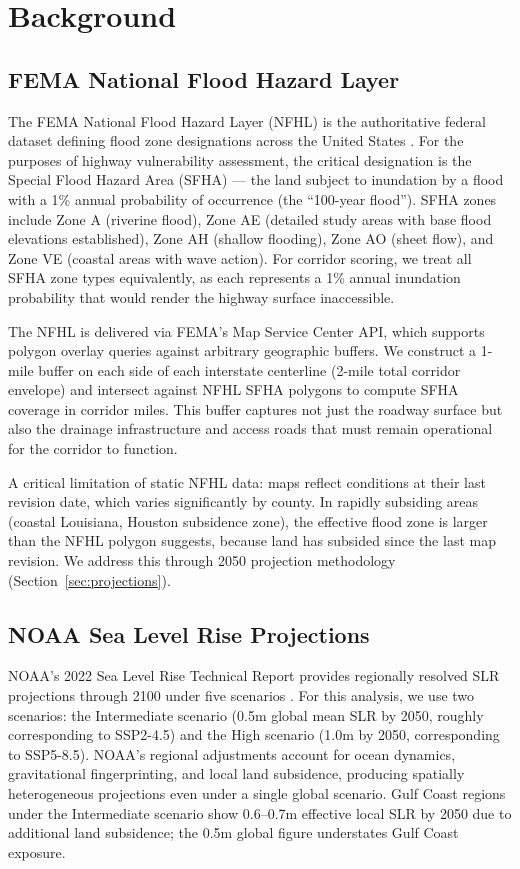 \section{Background}

\subsection{FEMA National Flood Hazard Layer}

The FEMA National Flood Hazard Layer (NFHL) is the authoritative federal dataset defining
flood zone designations across the United States \citep{FEMA_NFHL}. For the purposes of
highway vulnerability assessment, the critical designation is the Special Flood Hazard Area
(SFHA) --- the land subject to inundation by a flood with a 1\% annual probability of
occurrence (the ``100-year flood''). SFHA zones include Zone A (riverine flood), Zone AE
(detailed study areas with base flood elevations established), Zone AH (shallow flooding),
Zone AO (sheet flow), and Zone VE (coastal areas with wave action). For corridor scoring,
we treat all SFHA zone types equivalently, as each represents a 1\% annual inundation
probability that would render the highway surface inaccessible.

The NFHL is delivered via FEMA's Map Service Center API, which supports polygon overlay
queries against arbitrary geographic buffers. We construct a 1-mile buffer on each side of
each interstate centerline (2-mile total corridor envelope) and intersect against NFHL SFHA
polygons to compute SFHA coverage in corridor miles. This buffer captures not just the
roadway surface but also the drainage infrastructure and access roads that must remain
operational for the corridor to function.

A critical limitation of static NFHL data: maps reflect conditions at their last revision
date, which varies significantly by county. In rapidly subsiding areas (coastal Louisiana,
Houston subsidence zone), the effective flood zone is larger than the NFHL polygon suggests,
because land has subsided since the last map revision. We address this through 2050 projection
methodology (Section~\ref{sec:projections}).

\subsection{NOAA Sea Level Rise Projections}

NOAA's 2022 Sea Level Rise Technical Report provides regionally resolved SLR projections
through 2100 under five scenarios \citep{NOAA_SLR2022}. For this analysis, we use two
scenarios: the Intermediate scenario (0.5m global mean SLR by 2050, roughly corresponding
to SSP2-4.5) and the High scenario (1.0m by 2050, corresponding to SSP5-8.5). NOAA's
regional adjustments account for ocean dynamics, gravitational fingerprinting, and local
land subsidence, producing spatially heterogeneous projections even under a single global
scenario. Gulf Coast regions under the Intermediate scenario show 0.6--0.7m effective local
SLR by 2050 due to additional land subsidence; the 0.5m global figure understates Gulf Coast
exposure.


